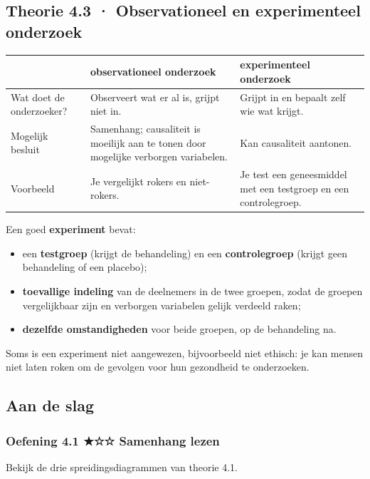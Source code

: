 \subsection*{Theorie 4.3 · Observationeel en experimenteel onderzoek}

\begin{theorie}
\begin{tabular}{lll}
\hline
 & observationeel onderzoek & experimenteel onderzoek \\
\hline
Wat doet de onderzoeker? & Observeert wat er al is, grijpt niet in. & Grijpt in en bepaalt zelf wie wat krijgt. \\
Mogelijk besluit & Samenhang; causaliteit is moeilijk aan te tonen door mogelijke verborgen variabelen. & Kan causaliteit aantonen. \\
Voorbeeld & Je vergelijkt rokers en niet-rokers. & Je test een geneesmiddel met een testgroep en een controlegroep. \\
\hline
\end{tabular}

Een goed \textbf{experiment} bevat:

\begin{itemize}
\item een \textbf{testgroep} (krijgt de behandeling) en een \textbf{controlegroep} (krijgt geen behandeling of een placebo);
\item \textbf{toevallige indeling} van de deelnemers in de twee groepen, zodat de groepen vergelijkbaar zijn en verborgen variabelen gelijk verdeeld raken;
\item \textbf{dezelfde omstandigheden} voor beide groepen, op de behandeling na.
\end{itemize}

Soms is een experiment niet aangewezen, bijvoorbeeld niet ethisch: je kan mensen niet laten roken om de gevolgen voor hun gezondheid te onderzoeken.
\end{theorie}

\subsection*{Aan de slag}

\subsubsection*{Oefening 4.1 \quad ★☆☆ \quad Samenhang lezen}

Bekijk de drie spreidingsdiagrammen van theorie 4.1.

